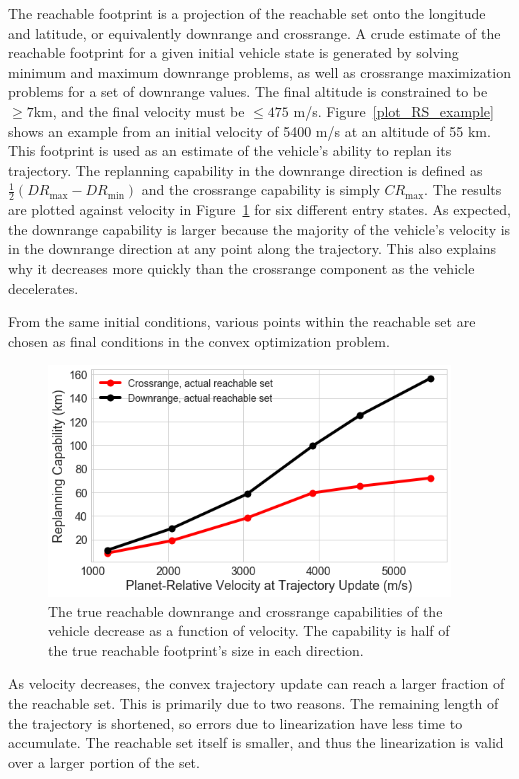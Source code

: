 \documentclass[letterpaper, preprint, paper,11pt]{AAS}	%
\begin{document}
	The reachable footprint is a projection of the reachable set onto the longitude and latitude, or equivalently downrange and crossrange. A crude estimate of the reachable footprint for a given initial vehicle state is generated by solving minimum and maximum downrange problems, as well as crossrange maximization problems for a set of downrange values. The final altitude is constrained to be $\ge 7 $km, and the final velocity must be $\le 475$ m/s. Figure~\ref{plot_RS_example} shows an example from an initial velocity of 5400 m/s at an altitude of 55 km. This footprint is used as an estimate of the vehicle's ability to replan its trajectory. The replanning capability in the downrange direction is defined as $\frac{1}{2}(DR_{\max}-DR_{\min})$ and the crossrange capability is simply $ CR_{\max} $. The results are plotted against velocity in Figure~\ref{plot_reachable_radii} for six different entry states. As expected, the downrange capability is larger because the majority of the vehicle's velocity is in the downrange direction at any point along the trajectory. This also explains why it decreases more quickly than the crossrange component as the vehicle decelerates.
	
	From the same initial conditions, various points within the reachable set are chosen as final conditions in the convex optimization problem. 
	
		\begin{figure}
		\includegraphics[width=0.95\textwidth,keepaspectratio=true]{reachable_radii}
		\caption{The true reachable downrange and crossrange capabilities of the vehicle decrease as a function of velocity. The capability is half of the true reachable footprint's size in each direction.}
		\label{plot_reachable_radii}
		\end{figure}
	
	As velocity decreases, the convex trajectory update can reach a larger fraction of the reachable set. This is primarily due to two reasons. The remaining length of the trajectory is shortened, so errors due to linearization have less time to accumulate. The reachable set itself is smaller, and thus the linearization is valid over a larger portion of the set. 
\end{document}
